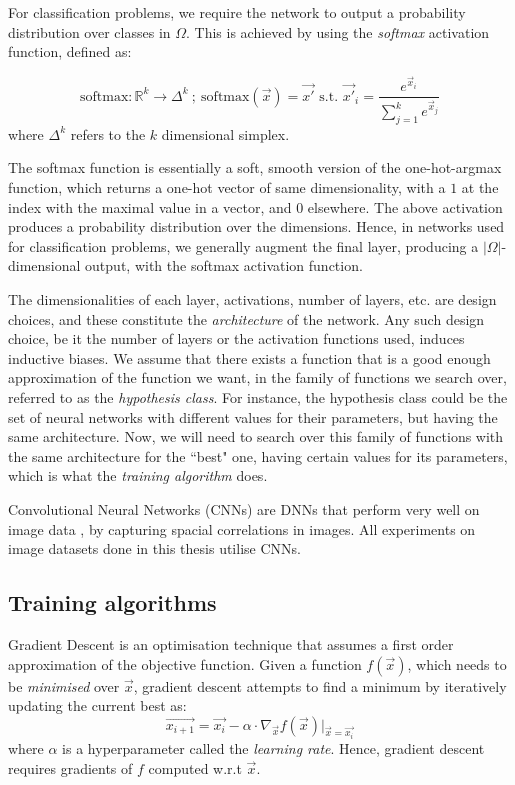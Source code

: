 \documentclass{ociamthesis}
\begin{document}
For classification problems, we require the network to output a probability
distribution over classes in $\Omega$. This is achieved by using the
\emph{softmax} activation function, defined as:

\begin{equation*}
    \text{softmax}: \mathbb{R}^k \to \Delta^k~;~
    \text{softmax}(\vec{x}) = \vec{x'} \text{ s.t. } 
    \vec{x'}_i = \frac{e^{\vec{x}_i}}{\sum_{j=1}^{k}e^{\vec{x}_j}}
\end{equation*}
where $\Delta^k$ refers to the $k$ dimensional simplex.

The softmax function is essentially a soft, smooth version of the one-hot-argmax
function, which returns a one-hot vector of same dimensionality, with a $1$ at
the index with the maximal value in a vector, and 0 elsewhere. The above
activation produces a probability distribution over the dimensions. Hence, in
networks used for classification problems, we generally augment the final layer,
producing a $|\Omega|$-dimensional output, with the softmax activation function.

The dimensionalities of each layer, activations, number of layers, etc. are
design choices, and these constitute the \emph{architecture} of the network. Any
such design choice, be it the number of layers or the activation functions used,
induces inductive biases. We assume that there exists a function that is a good
enough approximation of the function we want, in the family of functions we
search over, referred to as the \emph{hypothesis class}. For instance, the
hypothesis class could be the set of neural networks with different values for
their parameters, but having the same architecture. Now, we will need to search
over this family of functions with the same architecture for the ``best" one,
having certain values for its parameters, which is what the \emph{training
algorithm} does.


Convolutional Neural Networks (CNNs) are DNNs that perform very well on image
data \citep{imagenet,neco.1989.1.4.541}, by capturing spacial correlations in
images. All experiments on image datasets done in this thesis utilise CNNs.

\subsection{Training algorithms}
\label{section:sgd}
Gradient Descent is an optimisation technique that assumes a first order
approximation of the objective function. Given a function $f(\vec{x})$, which
needs to be \emph{minimised} over $\vec{x}$, gradient descent attempts to find a
minimum by iteratively updating the current best as:
\begin{equation*}
    \vec{x_{i+1}}
    = \vec{x_i} -
        \alpha \cdot \nabla_\vec{x} f(\vec{x}) \bigr \rvert _{\vec{x}=\vec{x_i}}
\end{equation*}
where $\alpha$ is a hyperparameter called the \emph{learning rate}. Hence,
gradient descent requires gradients of $f$ computed w.r.t $\vec{x}$.
\end{document}

